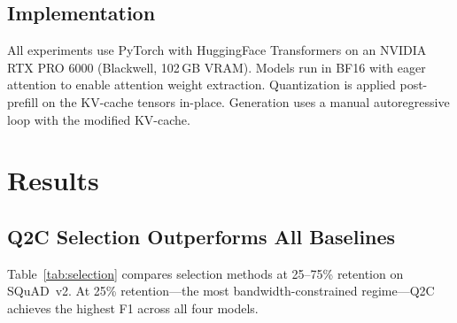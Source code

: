 \documentclass[conference]{IEEEtran}
\newcommand{\QtoC}{\textsc{Q2C}\xspace}
\begin{document}
\subsection{Implementation}

All experiments use PyTorch with HuggingFace Transformers on an NVIDIA RTX PRO 6000 (Blackwell, 102\,GB VRAM).
Models run in BF16 with eager attention to enable attention weight extraction.
Quantization is applied post-prefill on the KV-cache tensors in-place.
Generation uses a manual autoregressive loop with the modified KV-cache.


\section{Results}
\label{sec:results}

\subsection{\QtoC Selection Outperforms All Baselines}

Table~\ref{tab:selection} compares selection methods at 25--75\% retention on SQuAD~v2.
At 25\% retention---the most bandwidth-constrained regime---\QtoC achieves the highest F1 across all four models.
\end{document}
